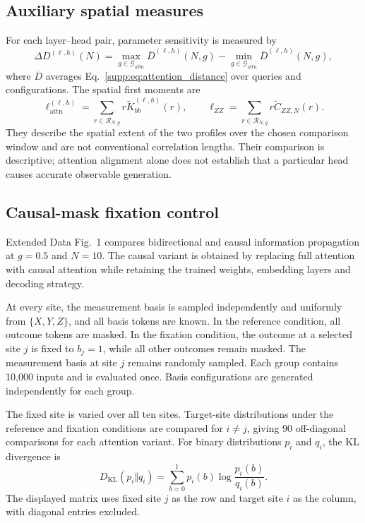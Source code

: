 \documentclass[11pt,a4paper]{article}
\newcommand{\TBD}[1]{\textcolor{red!70!black}{\textsf{[TBD: #1]}}}
\newcommand{\subhead}[1]{\subsection*{#1}}
\begin{document}
\subhead{Auxiliary spatial measures}
For each layer--head pair, parameter sensitivity is measured by
\begin{equation}
\Delta D^{(\ell,h)}(N)
=\max_{g\in\mathcal{G}_{\mathrm{attn}}}\overline{D}^{(\ell,h)}(N,g)
-\min_{g\in\mathcal{G}_{\mathrm{attn}}}\overline{D}^{(\ell,h)}(N,g),
\label{supp:eq:delta_distance}
\end{equation}
where $\overline{D}$ averages Eq.~\eqref{supp:eq:attention_distance}
over queries and configurations. The spatial first moments are
\begin{equation}
\ell_{\mathrm{attn}}^{(\ell,h)}
=\sum_{r\in\mathcal{R}_{N,g}}r\widetilde{K}^{(\ell,h)}_{bb}(r),
\qquad
\ell_{ZZ}=\sum_{r\in\mathcal{R}_{N,g}}r\widetilde{C}_{ZZ,N}(r).
\label{supp:eq:spatial_moments}
\end{equation}
They describe the spatial extent of the two profiles over the chosen
comparison window and are not conventional correlation lengths.
Their comparison is descriptive; attention alignment alone does not
establish that a particular head causes accurate observable generation.

\subhead{Causal-mask fixation control}
Extended Data Fig.~1 compares bidirectional and causal information
propagation at $g=0.5$ and $N=10$. The causal variant is obtained by
replacing full attention with causal attention while retaining the
trained weights, embedding layers and decoding strategy.

At every site, the measurement basis is sampled independently and
uniformly from $\{X,Y,Z\}$, and all basis tokens are known.
In the reference condition, all outcome tokens are masked.
In the fixation condition, the outcome at a selected site $j$ is
fixed to $b_j=1$, while all other outcomes remain masked.
The measurement basis at site $j$ remains randomly sampled.
Each group contains 10,000 inputs and is evaluated once.
Basis configurations are generated independently for each group.


The fixed site is varied over all ten sites. Target-site distributions
under the reference and fixation conditions are compared for $i\ne j$,
giving 90 off-diagonal comparisons for each attention variant.
For binary distributions $p_i$ and $q_i$, the KL divergence is
\begin{equation}
D_{\mathrm{KL}}(p_i\Vert q_i)
=
\sum_{b=0}^{1}
p_i(b)\log\frac{p_i(b)}{q_i(b)}.
\label{supp:eq:fixation_kl}
\end{equation}
The displayed matrix uses fixed site $j$ as the row and target site
$i$ as the column, with diagonal entries excluded.
\end{document}
